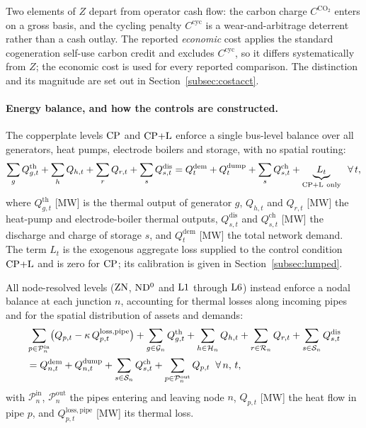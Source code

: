 Two elements of $Z$ depart from operator cash flow: the carbon charge $C^{\mathrm{CO_2}}$
enters on a gross basis, and the cycling penalty $C^{\mathrm{cyc}}$ is a wear-and-arbitrage
deterrent rather than a cash outlay. The reported \emph{economic} cost applies the standard
cogeneration self-use carbon credit and excludes $C^{\mathrm{cyc}}$, so it differs
systematically from $Z$; the economic cost is used for every reported comparison. The
distinction and its magnitude are set out in Section~\ref{subsec:costacct}.

\paragraph{Energy balance, and how the controls are constructed.}
The copperplate levels $\mathrm{CP}$ and $\mathrm{CP{+}L}$ enforce a single bus-level balance over all
generators, heat pumps, electrode boilers and storage, with no spatial routing:
\begin{equation}
  \sum_{g} Q_{g,t}^{\mathrm{th}}
    + \sum_{h} Q_{h,t} + \sum_{r} Q_{r,t}
    + \sum_{s} Q_{s,t}^{\mathrm{dis}}
  = Q_t^{\mathrm{dem}} + Q_t^{\mathrm{dump}}
    + \sum_{s} Q_{s,t}^{\mathrm{ch}}
  + \underbrace{L_t}_{\mathrm{CP{+}L}\ \mathrm{only}}
  \;\; \forall\, t,
  \label{eq:balance_cp}
\end{equation}
where $Q_{g,t}^{\mathrm{th}}$ [MW] is the thermal output of generator $g$,
$Q_{h,t}$ and $Q_{r,t}$ [MW] the heat-pump and electrode-boiler thermal outputs,
$Q_{s,t}^{\mathrm{dis}}$ and $Q_{s,t}^{\mathrm{ch}}$ [MW] the discharge and charge of
storage $s$, and $Q_t^{\mathrm{dem}}$ [MW] the total network demand. The term $L_t$ is
the exogenous aggregate loss supplied to the control condition $\mathrm{CP{+}L}$ and is zero for
$\mathrm{CP}$; its calibration is given in Section~\ref{subsec:lumped}.

All node-resolved levels ($\mathrm{ZN}$, $\mathrm{ND^{0}}$ and $\mathrm{L1}$ through $\mathrm{L6}$) instead enforce
a nodal balance at each junction $n$, accounting for thermal losses along incoming pipes
and for the spatial distribution of assets and demands:
\begin{align}
  &\sum_{p \in \mathcal{P}_n^{\mathrm{in}}}
    \bigl(Q_{p,t} - \kappa\, Q_{p,t}^{\mathrm{loss,pipe}}\bigr)
  + \sum_{g \in \mathcal{G}_n} Q_{g,t}^{\mathrm{th}}
  + \sum_{h \in \mathcal{H}_n} Q_{h,t}
  + \sum_{r \in \mathcal{R}_n} Q_{r,t}
  + \sum_{s \in \mathcal{S}_n} Q_{s,t}^{\mathrm{dis}} \notag \\
  &= Q_{n,t}^{\mathrm{dem}} + Q_{n,t}^{\mathrm{dump}}
  + \sum_{s \in \mathcal{S}_n} Q_{s,t}^{\mathrm{ch}}
  + \sum_{p \in \mathcal{P}_n^{\mathrm{out}}} Q_{p,t}
  \;\; \forall\, n,\, t,
  \label{eq:balance_nodal}
\end{align}
with $\mathcal{P}_n^{\mathrm{in}}$, $\mathcal{P}_n^{\mathrm{out}}$ the pipes entering and
leaving node $n$, $Q_{p,t}$ [MW] the heat flow in pipe $p$, and
$Q_{p,t}^{\mathrm{loss,pipe}}$ [MW] its thermal loss.

